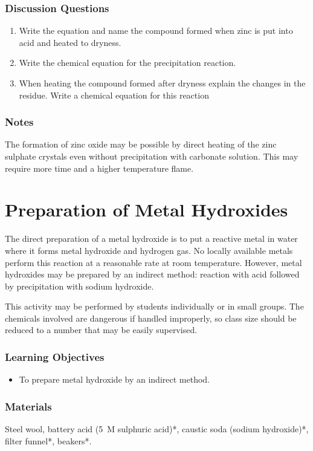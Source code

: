 \subsubsection*{Discussion Questions}
\begin{enumerate}
\item{Write the equation and name the compound formed when zinc is put into acid and heated to dryness.}
\item{Write the chemical equation for the precipitation reaction.}
\item{When heating the compound formed after dryness explain the changes in the residue. Write a chemical equation for this reaction}
\end{enumerate}
\subsubsection*{Notes}
The formation of zinc oxide may be possible by direct heating of the zinc sulphate crystals even without precipitation with carbonate solution. This may require more time and a higher temperature flame.

\section{Preparation of Metal Hydroxides}

The direct preparation of a metal hydroxide is to put a reactive metal in water where it forms metal hydroxide and hydrogen gas. No locally available metals perform this reaction at a reasonable rate at room temperature. However, metal hydroxides may be prepared by an indirect method: reaction with acid followed by precipitation with sodium hydroxide.

This activity may be performed by students individually or in small groups. The chemicals involved are dangerous if handled improperly, so class size should be reduced to a number that may be easily supervised.

\subsubsection*{Learning Objectives}
\begin{itemize}
\item{To prepare metal hydroxide by an indirect method.}
\end{itemize}

\subsubsection*{Materials}
Steel wool, battery acid (5~M sulphuric acid)*, caustic soda (sodium hydroxide)*, filter funnel*, beakers*.

